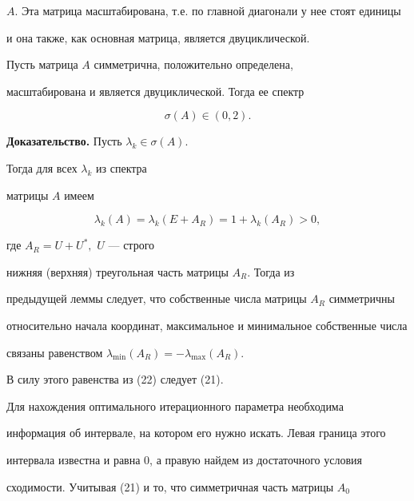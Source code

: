 $A.$ Эта матрица масштабирована, т.е. по главной диагонали у нее стоят единицы 


и она также, как основная матрица, является двуциклической. 


 


\begin{thm} Пусть матрица $A$ симметрична, положительно определена, 


масштабирована и является двуциклической. Тогда ее спектр 


\begin{equation} 


\sigma(A) \in (0,2). 


\end{equation} 


\end{thm} 


 


{\bf Доказательство.} Пусть $\lambda_k \in \sigma(A)$. 


Тогда для всех $\lambda_k$ из спектра 


матрицы $A$ имеем 


\begin{equation} 


\lambda_k (A)=\lambda_k(E+A_R) = 1+\lambda_k(A_R)>0, 


\end{equation} 


где $A_R=U+U^*,$ $U$ --- строго 


нижняя (верхняя) треугольная часть матрицы $A_R$. Тогда из 


предыдущей леммы следует, что собственные числа матрицы $A_R$ симметричны 


относительно начала координат, максимальное и минимальное собственные числа 


связаны равенством $\lambda_{\text{min}}(A_R)=-\lambda_{\text{max}}(A_R)$. 


В силу этого равенства из (22) следует (21). 


 


Для нахождения оптимального итерационного параметра необходима 


информация об интервале, на котором его нужно искать. Левая граница этого 


интервала известна и равна 0, а правую найдем из достаточного условия 


сходимости. Учитывая (21) и то, что симметричная часть матрицы $A_0$ 


